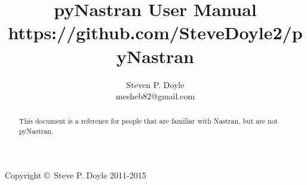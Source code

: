 \documentclass[a4paper,12pt]{article}
\begin{document}
\title{pyNastran User Manual \\
\small https://github.com/SteveDoyle2/pyNastran }
\author{Steven P. Doyle\\
{\small mesheb82@gmail.com}
}

\maketitle

\begin{abstract}
This document is a reference for people that are familiar with Nastran, but are not pyNastran.
\end{abstract}

Copyright \copyright\ Steve P. Doyle 2011-2015
\newpage

\tableofcontents
\newpage


\newpage

%


%


%
%
%
%

%
%
\end{document}

